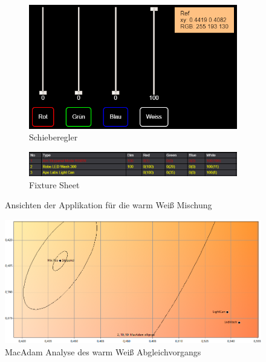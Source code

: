 \documentclass[11pt]{scrartcl}
\begin{document}
\noindent
\begin{figure}[H]
    \centering
    \begin{subfigure}[b]{.39\textwidth}
        \includegraphics[width=\textwidth]{images/app_mix_warmWhite_faders.png}
        \caption{Schieberegler}
    \end{subfigure}
    \hfill 
    \begin{subfigure}[b]{.59\textwidth}
        \includegraphics[width=\textwidth]{images/app_mix_warmWhite_fixtureSheet.png}
        \caption{Fixture Sheet}
    \end{subfigure}
    \caption{Ansichten der Applikation für die warm Weiß Mischung}
\end{figure}
\begin{figure}[H]
    \begin{center}
        \includegraphics[width=.9\textwidth]{images/macAdam/comparedWarmWhite.png}
    \end{center}
    \caption{MacAdam Analyse des warm Weiß Abgleichvorgangs}
\end{figure}
\end{document}
